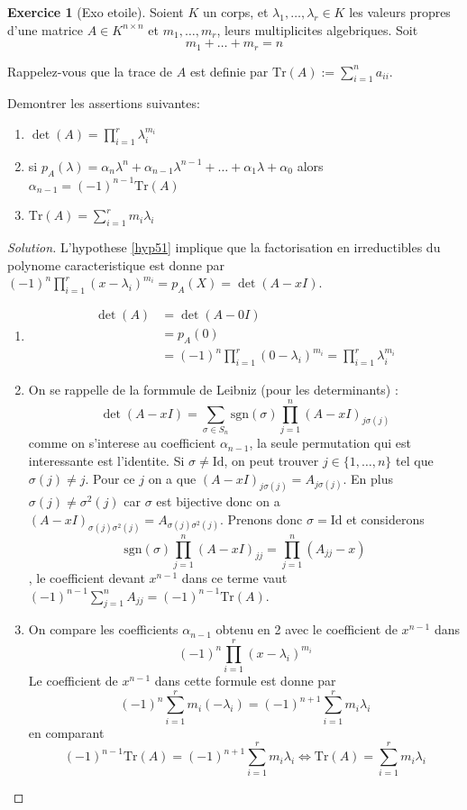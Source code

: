 \documentclass[a4paper,12pt,french]{report}
\theoremstyle{plain}
\theoremstyle{definition}
\newtheorem{exercise}{Exercice}[chapter]
\begin{document}
\begin{exercise}[Exo etoile]
Soient $K$ un corps, et $\lambda_{1},\dots,\lambda _{r}\in K$ les valeurs propres d'une matrice $A\in K^{n\times n}$ et $m_{1},\dots,m_{r}$, leurs multiplicites algebriques. Soit
\begin{equation}
m_{1}+\dots +m_{r}=n \label{hyp51}
\end{equation}

Rappelez-vous que la trace de $A$ est definie par $\mathrm{Tr}(A):=\sum_{i=1}^{n}a_{ii}$.

Demontrer les assertions suivantes:
\begin{enumerate}
\item $\det(A)=\prod_{i=1}^{r}\lambda _{i}^{m_{i}}$
\item si $p_{A}(\lambda)=\alpha _{n}\lambda^{n}+\alpha _{n-1}\lambda^{n-1}+\dots +\alpha_{1}\lambda +\alpha_{0}$ alors $\alpha _{n-1}=(-1)^{n-1}\mathrm{Tr}(A)$
\item $\mathrm{Tr}(A)=\sum_{i=1}^{r}m_{i}\lambda _{i}$
\end{enumerate}
\end{exercise}
\begin{proof}[Solution]
L'hypothese \ref{hyp51} implique que la factorisation en irreductibles du polynome caracteristique est donne par $(-1)^{n}\prod_{i=1}^{r}(x-\lambda _{i})^{m_{i}}=p_{A}(X)=\det(A-xI)$.  
\begin{enumerate}
\item 
\begin{align}
\det(A) & =\det(A-0I) \\
 & =p_{A}(0) \\
 & =(-1)^{n}\prod_{i=1}^{r} (0-\lambda _{i})^{m_{i}}=\prod_{i=1}^{r} \lambda _{i}^{m_{i}}
\end{align}
\item On se rappelle de la formmule de Leibniz (pour les determinants) :
$$
\det(A-xI)=\sum _{\sigma \in S_{n}}\mathrm{sgn}(\sigma)\prod_{j=1}^{n}(A-xI)_{j\sigma (j)} 
$$
comme on s'interese au coefficient $\alpha _{n-1}$, la seule permutation qui est interessante est l'identite. Si $\sigma\neq \mathrm{Id}$, on peut trouver $j\in \{ 1,\dots ,n\}$ tel que $\sigma(j)\neq j$. Pour ce $j$ on a que $(A-xI)_{j\sigma(j)}=A_{j\sigma(j)}$. En plus $\sigma(j)\neq\sigma^{2}(j)$ car $\sigma$ est bijective donc on a $(A-xI)_{\sigma(j)\sigma^{2}(j)}=A_{\sigma(j)\sigma^{2}(j)}$. Prenons donc $\sigma=\mathrm{Id}$ et considerons $$\mathrm{sgn}(\sigma)\prod_{j=1}^{n}(A-xI)_{jj}=\prod_{j=1}^{n} (A_{jj}-x)$$, le coefficient devant $x^{n-1}$ dans ce terme vaut $(-1)^{n-1}\sum_{j=1}^{n}A_{jj}=(-1)^{n-1}\mathrm{Tr}(A)$.
\item On compare les coefficients $\alpha _{n-1}$ obtenu en 2 avec le coefficient de $x^{n-1}$ dans 
$$
(-1)^{n}\prod_{i=1}^{r}(x-\lambda _{i})^{m_{i}} 
$$
Le coefficient de $x^{n-1}$ dans cette formule est donne par
$$
(-1)^{n}\sum_{i=1}^{r} m_{i}(-\lambda _{i})=(-1)^{n+1}\sum_{i=1}^{r} m_{i}\lambda _{i}
$$
en comparant 
$$
(-1)^{n-1}\mathrm{Tr}(A)=(-1)^{n+1}\sum_{i=1}^{r} m_{i}\lambda _{i}\Leftrightarrow \mathrm{Tr}(A)=\sum_{i=1}^{r} m_{i}\lambda _{i}
$$
\end{enumerate}
\end{proof}
\end{document}
